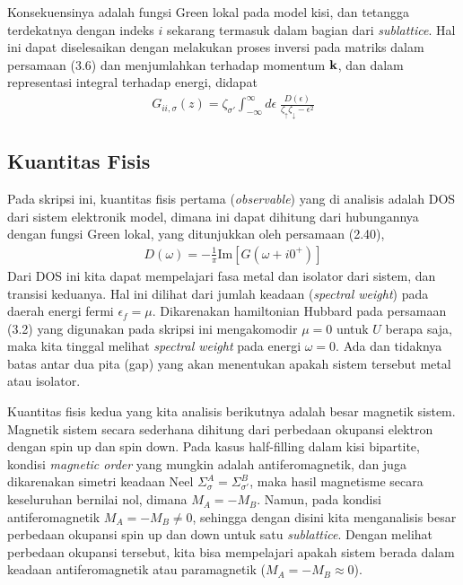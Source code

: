 Konsekuensinya adalah fungsi Green lokal pada model kisi, dan tetangga terdekatnya dengan indeks $i$ sekarang termasuk dalam bagian dari \textit{sublattice}. Hal ini dapat diselesaikan dengan melakukan proses inversi pada matriks dalam persamaan (3.6) dan menjumlahkan terhadap momentum $\textbf{k}$, dan dalam representasi integral terhadap energi, didapat\cite{DMFT}
\begin{align}
G_{ii,\sigma}(z) = \zeta_{\sigma'} \int_{-\infty}^\infty d\epsilon \; \frac{D(\epsilon)}{\zeta_\uparrow \zeta_\downarrow - \epsilon^2}
\end{align}

\subsection{Kuantitas Fisis}

Pada skripsi ini, kuantitas fisis pertama (\textit{observable}) yang di analisis adalah DOS dari sistem elektronik model, dimana ini dapat dihitung dari hubungannya dengan fungsi Green lokal, yang ditunjukkan oleh persamaan (2.40),
\begin{align}
D(\omega) = - \frac{1}{\pi} \text{Im} [G(\omega + i0^+)]
\end{align}
Dari DOS ini kita dapat mempelajari fasa metal dan isolator dari sistem, dan transisi keduanya. Hal ini dilihat dari jumlah keadaan (\textit{spectral weight}) pada daerah energi fermi $\epsilon_f = \mu$. Dikarenakan hamiltonian Hubbard pada persamaan (3.2) yang digunakan pada skripsi ini mengakomodir $\mu =0$ untuk $U$ berapa saja, maka kita tinggal melihat \textit{spectral weight} pada energi $\omega = 0$. Ada dan tidaknya batas antar dua pita (gap) yang akan menentukan apakah sistem tersebut metal atau isolator.

Kuantitas fisis kedua yang kita analisis berikutnya adalah besar magnetik sistem. Magnetik sistem secara sederhana dihitung dari perbedaan okupansi elektron dengan spin up dan spin down. Pada kasus half-filling dalam kisi bipartite, kondisi \textit{magnetic order} yang mungkin adalah antiferomagnetik, dan juga dikarenakan simetri keadaan Neel $\Sigma^A_\sigma = \Sigma^B_{\sigma'}$, maka hasil magnetisme secara keseluruhan bernilai nol, dimana $M_A = - M_B$. Namun, pada kondisi antiferomagnetik $M_A = - M_B \neq 0$, sehingga dengan disini kita menganalisis besar perbedaan okupansi spin up dan down untuk satu \textit{sublattice}. Dengan melihat perbedaan okupansi tersebut, kita bisa mempelajari apakah sistem berada dalam keadaan antiferomagnetik atau paramagnetik ($M_A = - M_B \approx 0$). 

